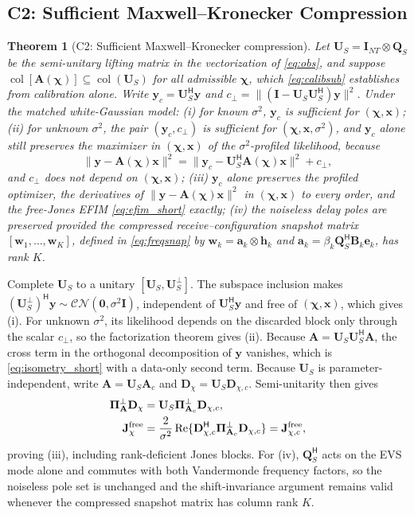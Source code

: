 \documentclass[letterpaper,journal]{IEEEtran}
\newtheorem{theorem}{Theorem}
\newcommand{\bx}{\mathbf{x}}
\newcommand{\by}{\mathbf{y}}
\newcommand{\ba}{\mathbf{a}}
\newcommand{\be}{\mathbf{e}}
\newcommand{\bh}{\mathbf{h}}
\newcommand{\bw}{\mathbf{w}}
\newcommand{\bA}{\mathbf{A}}
\newcommand{\bBm}{\mathbf{B}}
\newcommand{\bD}{\mathbf{D}}
\newcommand{\bI}{\mathbf{I}}
\newcommand{\bJ}{\mathbf{J}}
\newcommand{\bQ}{\mathbf{Q}}
\newcommand{\bU}{\mathbf{U}}
\newcommand{\bPi}{\boldsymbol{\Pi}}
\newcommand{\bchi}{\boldsymbol{\chi}}
\newcommand{\Real}{\operatorname{Re}}
\newcommand{\coll}{\operatorname{col}}
\begin{document}
\subsection{C2: Sufficient Maxwell--Kronecker Compression}
\begin{theorem}[C2: Sufficient Maxwell--Kronecker compression]
\label{thm:compress}
Let $\bU_S=\bI_{NT}\otimes\bQ_S$ be the semi-unitary lifting matrix in the
vectorization of \eqref{eq:obs}, and suppose
$\coll[\bA(\bchi)]\subseteq\coll(\bU_S)$ for all admissible $\bchi$, which
\eqref{eq:calibsub} establishes from calibration alone. Write
$\by_c=\bU_S^{\mathsf H}\by$ and
$c_\perp=\|(\bI-\bU_S\bU_S^{\mathsf H})\by\|^2$. Under the matched
white-Gaussian model:
(i) for known $\sigma^2$, $\by_c$ is sufficient for $(\bchi,\bx)$;
(ii) for unknown $\sigma^2$, the pair $(\by_c,c_\perp)$ is sufficient for
$(\bchi,\bx,\sigma^2)$, and $\by_c$ alone still preserves the maximizer in
$(\bchi,\bx)$ of the $\sigma^2$-profiled likelihood, because
\begin{equation}
 \|\by-\bA(\bchi)\bx\|^2
 =\|\by_c-\bU_S^{\mathsf H}\bA(\bchi)\bx\|^2+c_\perp,
 \label{eq:isometry_short}
\end{equation}
and $c_\perp$ does not depend on $(\bchi,\bx)$;
(iii) $\by_c$ alone preserves the profiled optimizer, the derivatives of
$\|\by-\bA(\bchi)\bx\|^2$ in $(\bchi,\bx)$ to every order, and the free-Jones
EFIM \eqref{eq:efim_short} exactly;
(iv) the noiseless delay poles are preserved provided the compressed
receive--configuration snapshot matrix $[\bw_1,\ldots,\bw_K]$, defined in
\eqref{eq:freqsnap} by $\bw_k=\ba_k\otimes\bh_k$ and
$\ba_k=\beta_k\bQ_S^{\mathsf H}\bBm_k\be_k$, has rank $K$.
\end{theorem}

\begin{IEEEproof}
Complete $\bU_S$ to a unitary $[\bU_S,\bU_S^{\perp}]$. The subspace
inclusion makes $(\bU_S^{\perp})^{\mathsf H}\by\sim
\mathcal{CN}(\mathbf0,\sigma^2\bI)$, independent of $\bU_S^{\mathsf H}\by$
and free of $(\bchi,\bx)$, which gives (i). For unknown $\sigma^2$, its
likelihood depends on the discarded block only through the scalar $c_\perp$, so the
factorization theorem gives (ii). Because $\bA=\bU_S\bU_S^{\mathsf H}\bA$,
the cross term in the orthogonal decomposition of $\by$ vanishes, which is
\eqref{eq:isometry_short} with a data-only second term. Because $\bU_S$ is
parameter-independent, write $\bA=\bU_S\bA_c$ and
$\bD_\chi=\bU_S\bD_{\chi,c}$. Semi-unitarity then gives
\begin{align}
 \bPi_{\bA}^{\perp}\bD_\chi
 &=\bU_S\bPi_{\bA_c}^{\perp}\bD_{\chi,c},\nonumber\\
 \bJ_\chi^{\rm free}
 &=\frac{2}{\sigma^2}\Real\{\bD_{\chi,c}^{\mathsf H}
 \bPi_{\bA_c}^{\perp}\bD_{\chi,c}\}
 =\bJ_{\chi,c}^{\rm free},
 \label{eq:efim_isometry}
\end{align}
proving (iii), including rank-deficient Jones blocks.
For (iv), $\bQ_S^{\mathsf H}$ acts on the EVS mode
alone and commutes with both Vandermonde frequency factors, so the noiseless
pole set is unchanged and the shift-invariance argument remains valid whenever
the compressed snapshot matrix has column rank $K$.
\end{IEEEproof}
\end{document}
